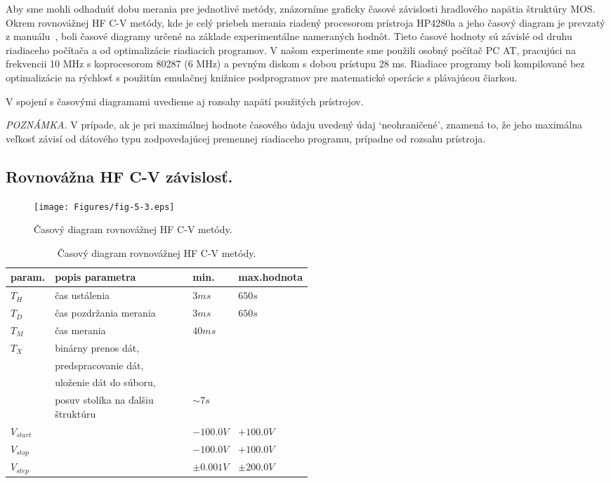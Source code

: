 Aby sme mohli odhadnúť dobu merania pre jednotlivé metódy, znázorníme
graficky časové závislosti hradlového napätia štruktúry MOS\@. Okrem
rovnovážnej HF C-V metódy, kde je celý priebeh merania riadený
procesorom prístroja HP4280a a jeho časový diagram je prevzatý z
manuálu~\cite{5.7}, boli časové diagramy určené na základe
experimentálne nameraných hodnôt. Tieto časové hodnoty sú závislé od
druhu riadiaceho počítača a od optimalizácie riadiacich programov. V
našom experimente sme použili osobný počítač PC AT, pracujúci na
frekvencii 10 MHz s koprocesorom 80287 (6 MHz) a pevným diskom s dobou
prístupu 28 ms. Riadiace programy boli kompilované bez optimalizácie
na rýchlosť s použitím emulačnej knižnice podprogramov pre matematické
operácie s plávajúcou čiarkou.

V spojení s časovými diagramami uvedieme aj rozsahy napätí použitých
prístrojov.

\par\emph{POZNÁMKA.} V prípade, ak je pri maximálnej hodnote časového
údaju uvedený údaj `neohraničené', znamená to, že jeho maximálna
veľkosť závisí od dátového typu zodpovedajúcej premennej riadiaceho
programu, prípadne od rozsahu prístroja.


\newpage
\subsection{Rovnovážna HF C-V závislosť.}\label{sec:5.4.1}

\begin{figure}[h!]\centering
  \texttt{[image: Figures/fig-5-3.eps]}
  \caption[Časový diagram rovnovážnej HF C-V metódy]{Časový diagram
    rovnovážnej HF C-V metódy.}\label{fig:5.3}
\end{figure}

\begin{table}[h!]\centering
  \begin{tabular}{l p{0.5\linewidth} l l}
    param.      & popis parametra & min. & max.hodnota\\
    \hline%
    $T_H$       & čas ustálenia \dotfill & $3 ms$ &  $650 s$\\
    $T_D$       & čas pozdržania merania \dotfill & $3 ms$ & $650 s$\\
    $T_M$       & čas merania \dotfill & $40 ms$\\
    $T_X$       & binárny prenos dát,\\
                & predspracovanie dát,\\
                & uloženie dát do súboru,\\
                & posuv stolíka na ďalšiu štruktúru \dotfill & $\sim 7 s$\\
    $V_{start}$ & \dotfill & $-100.0 V$ & $+100.0 V$\\
    $V_{stop}$  & \dotfill & $-100.0 V$ & $+100.0 V$\\
    $V_{step}$  & \dotfill & $\pm 0.001 V$ & $\pm 200.0 V$\\
    \hline
  \end{tabular}
  \caption[Časový diagram rovnovážnej HF C-V metódy]{Časový diagram
    rovnovážnej HF C-V metódy.}\label{tab:5.1}
\end{table}

